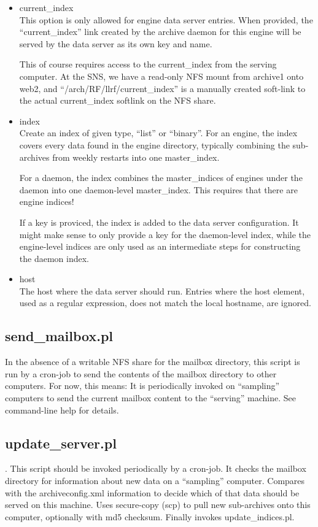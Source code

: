 \begin{itemize}
\item current\_index\\
      This option is only allowed for engine data server entries.
      When provided, the ``current\_index'' link created by the
      archive daemon for this engine will be served by the
      data server as its own key and name.

      This of course requires access to the current\_index from the
      serving computer. At the SNS, we have a read-only NFS mount from
      archive1 onto web2, and ``/arch/RF/llrf/current\_index'' is a
      manually created soft-link to the actual current\_index softlink
      on the NFS share.
\item index \\
      Create an index of given type, ``list'' or ``binary''.
      For an engine, the index covers every data found in the engine
      directory, typically combining the sub-archives from weekly
      restarts into one master\_index.

      For a daemon, the index combines the master\_indices of engines
      under the daemon into one daemon-level master\_index. This
      requires that there are engine indices!

      If a key is proviced, the index is added to the data server
      configuration. It might make sense to only provide a key for the
      daemon-level index, while the engine-level indices are only used
      as an intermediate steps for constructing the daemon index.            
\item host \\
      The host where the data server should run. Entries where
      the host element, used as a regular expression, does not match the
      local hostname, are ignored.
\end{itemize}

\subsection{send\_mailbox.pl}
In the absence of a writable NFS share for the mailbox directory,
this script is run by a cron-job to send the contents of the mailbox
directory to other computers.
For now, this means: It is periodically invoked on ``sampling''
computers to send the current mailbox content to the ``serving''
machine. See command-line help for details.

\subsection{update\_server.pl} \label{sec:updateServer}.
This script should be invoked periodically by a cron-job.
It checks the mailbox directory for information about new data on a
``sampling'' computer. Compares with the archiveconfig.xml information
to decide which of that data should be served on this machine. Uses
secure-copy (scp) to pull new sub-archives onto this computer,
optionally with md5 checksum.  Finally invokes update\_indices.pl.

